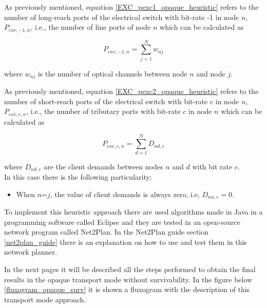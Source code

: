 As previously mentioned, equation \ref{EXC_pexc1_opaque_heuristic} refers to the number of long-reach ports of the electrical switch with bit-rate -1 in node $n$, $P_{exc,-1,n}$, i.e., the number of line ports of node $n$ which can be calculated as

\begin{equation}
P_{exc,-1,n} = \sum_{j=1}^{N} w_{nj}
\label{EXC_pexc1_opaque_heuristic}
\end{equation}

\noindent
where $w_{nj}$ is the number of optical channels between node $n$ and node $j$.

\newpage
\vspace{11pt}
As previously mentioned, equation \ref{EXC_pexc2_opaque_heuristic} refers to the number of short-reach ports of the
electrical switch with bit-rate $c$ in node $n$, $P_{exc,c,n}$, i.e., the number of tributary ports with bit-rate $c$ in node $n$ which can be calculated as

\begin{equation}
P_{exc,c,n} = \sum_{d=1}^{N} D_{nd,c}
\label{EXC_pexc2_opaque_heuristic}
\end{equation}

\noindent
where $D_{nd,c}$ are the client demands between nodes $n$ and $d$ with bit rate $c$.\\

\noindent
In this case there is the following particularity:

\begin{itemize}
  \item When $n$=$j$, the value of client demands is always zero, i.e, $D_{nn,c}=0$.
\end{itemize}

\vspace{11pt}
To implement this heuristic approach there are used algorithms made in Java in a programming software called Eclipse and they are tested in an open-source network program called Net2Plan. In the Net2Plan guide section \ref{net2plan_guide} there is an explanation on how to use and test them in this network planner.

In the next pages it will be described all the steps performed to obtain the final results in the opaque transport mode without survivability. In the figure below \ref{fluxogram_opaque_surv} it is shown a fluxogram with the description of this transport mode approach.

